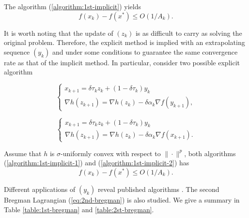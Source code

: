 \begin{proposition}
    The algorithm (\ref{algorithm:1st-implicit}) yields
    \begin{equation}
        f(x_k) - f(x^*) \le O\left(1/A_k\right).
    \end{equation}
\end{proposition}

It is worth noting that the update of $(z_k)$ is as difficult to carry as solving the original problem. Therefore, the explicit method is implied with an extrapolating sequence $(y_k)$ and under some conditions to guarantee the same convergence rate as that of the implicit method. In particular, consider two possible explicit algorithm

\begin{equation}
    \begin{cases}
        x_{k+1} = \delta\tau_kz_k + (1-\delta\tau_k)y_k \\
        \nabla h(z_{k+1}) = \nabla h(z_{k}) - \delta\alpha_k \nabla f(y_{k+1}),
    \end{cases}
    \label{algorithm:1st-implicit-1}
\end{equation}

\begin{equation}
    \begin{cases}
        x_{k+1} = \delta\tau_kz_k + (1-\delta\tau_k)y_k \\
        \nabla h(z_{k+1}) = \nabla h(z_{k}) - \delta\alpha_k \nabla f(x_{k+1}).
    \end{cases}
    \label{algorithm:1st-implicit-2}
\end{equation}

\begin{proposition}
    Assume that $h$ is $\sigma$-uniformly convex with respect to $\|\cdot\|^p$, both algorithms (\ref{algorithm:1st-implicit-1}) and (\ref{algorithm:1st-implicit-2}) has
    $$f(x_k) - f(x^*) \le O\left(1/A_k\right).$$
\end{proposition}

Different applications of $(y_k)$ reveal published algorithms \cite{wilson2021lyapunov}. The second Bregman Lagrangian (\ref{eq:2nd-bregman}) is also studied. We give a summary in Table \ref{table:1st-bregman} and \ref{table:2st-bregman}.


